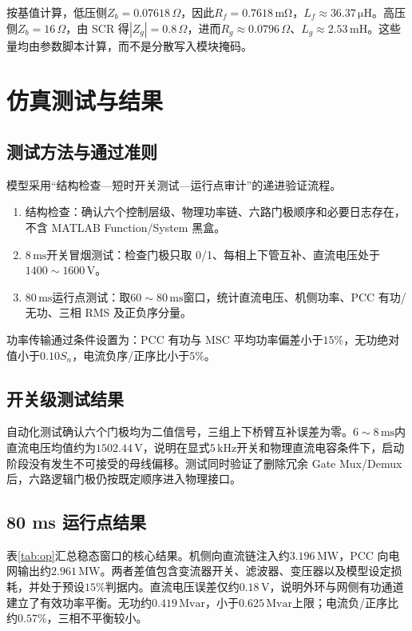 \documentclass[UTF8,zihao=-4,fontset=none]{ctexrep}
\begin{document}
按基值计算，低压侧\(Z_b=0.07618\,\Omega\)，因此\(R_f=0.7618\,\mathrm{m\Omega}\)，\(L_f\approx36.37\,\mathrm{\mu H}\)。高压侧\(Z_b=16\,\Omega\)，由 SCR 得\(|Z_g|=0.8\,\Omega\)，进而\(R_g\approx0.0796\,\Omega\)、\(L_g\approx2.53\,\mathrm{mH}\)。这些量均由参数脚本计算，而不是分散写入模块掩码。

\chapter{仿真测试与结果}
\section{测试方法与通过准则}
模型采用“结构检查---短时开关测试---运行点审计”的递进验证流程。
\begin{enumerate}
  \item 结构检查：确认六个控制层级、物理功率链、六路门极顺序和必要日志存在，不含 MATLAB Function/System 黑盒。
  \item \(8\,\mathrm{ms}\)开关冒烟测试：检查门极只取 0/1、每相上下管互补、直流电压处于\(1400\sim1600\,\mathrm{V}\)。
  \item \(80\,\mathrm{ms}\)运行点测试：取\(60\sim80\,\mathrm{ms}\)窗口，统计直流电压、机侧功率、PCC 有功/无功、三相 RMS 及正负序分量。
\end{enumerate}
功率传输通过条件设置为：PCC 有功与 MSC 平均功率偏差小于\(15\%\)，无功绝对值小于\(0.10S_n\)，电流负序/正序比小于\(5\%\)。

\section{开关级测试结果}
自动化测试确认六个门极均为二值信号，三组上下桥臂互补误差为零。\(6\sim8\,\mathrm{ms}\)内直流电压均值约为\(1502.44\,\mathrm{V}\)，说明在显式\(5\,\mathrm{kHz}\)开关和物理直流电容条件下，启动阶段没有发生不可接受的母线偏移。测试同时验证了删除冗余 Gate Mux/Demux 后，六路逻辑门极仍按既定顺序进入物理接口。

\section{80 ms 运行点结果}
表\ref{tab:op}汇总稳态窗口的核心结果。机侧向直流链注入约\(3.196\,\mathrm{MW}\)，PCC 向电网输出约\(2.961\,\mathrm{MW}\)。两者差值包含变流器开关、滤波器、变压器以及模型设定损耗，并处于预设\(15\%\)判据内。直流电压误差仅约\(0.18\,\mathrm{V}\)，说明外环与网侧有功通道建立了有效功率平衡。无功约\(0.419\,\mathrm{Mvar}\)，小于\(0.625\,\mathrm{Mvar}\)上限；电流负/正序比约\(0.57\%\)，三相不平衡较小。
\end{document}
